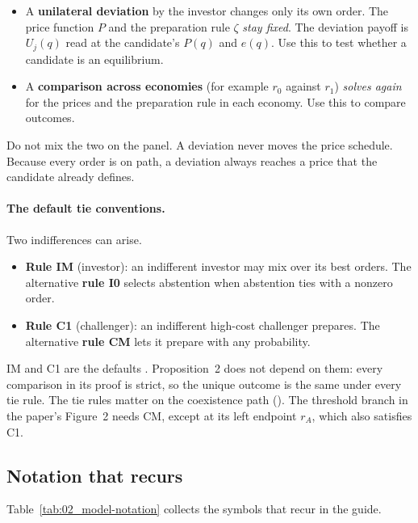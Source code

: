 \begin{caution}
\begin{itemize}
\item A \textbf{unilateral deviation} by the investor changes only its own order. The price function
\(P\) and the preparation rule \(\zeta\) \emph{stay fixed}. The deviation payoff is \(U_j(q)\) read at
the candidate's \(P(q)\) and \(e(q)\). Use this to test whether a candidate is an equilibrium.
\item A \textbf{comparison across economies} (for example \(r_0\) against \(r_1\)) \emph{solves again}
for the prices and the preparation rule in each economy. Use this to compare outcomes.
\end{itemize}
Do not mix the two on the panel. A deviation never moves the price schedule. Because every order is on
path, a deviation always reaches a price that the candidate already defines.
\end{caution}

\paragraph{The default tie conventions.} Two indifferences can arise.
\begin{itemize}
\item \textbf{Rule IM} (investor): an indifferent investor may mix over its best orders. The alternative
\textbf{rule I0} selects abstention when abstention ties with a nonzero order.
\item \textbf{Rule C1} (challenger): an indifferent high-cost challenger prepares. The alternative
\textbf{rule CM} lets it prepare with any probability.
\end{itemize}
IM and C1 are the defaults . Proposition~2 does not depend on them: every comparison in
its proof is strict, so the unique outcome is the same under every tie rule. The tie rules matter on the
coexistence path (). The threshold branch in the paper's Figure~2 needs CM, except at its left endpoint \(r_A\), which also satisfies C1.

\subsection{Notation that recurs}\label{sec:02_model-notation}

Table~\ref{tab:02_model-notation} collects the symbols that recur in the guide.

